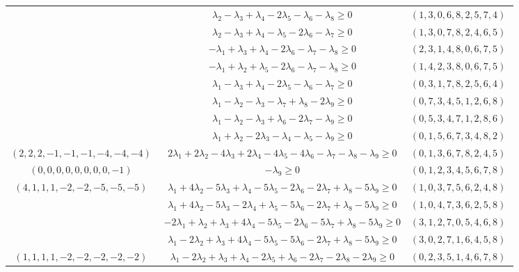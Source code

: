 \documentclass[12pt,landscape]{article}
\begin{document}
\begin{longtable}[l]{|c|c|c|}
 \cline{2-3} 
 & $\lambda_{2}-\lambda_{3} + \lambda_{4}-2\lambda_{5}-\lambda_{6}-\lambda_{8}\geq 0$ & $(1 ,3 ,0 ,6 ,8 ,2 ,5 ,7 ,4) \;$\\ 
 \cline{2-3} 
 & $\lambda_{2}-\lambda_{3} + \lambda_{4}-\lambda_{5}-2\lambda_{6}-\lambda_{7}\geq 0$ & $(1 ,3 ,0 ,7 ,8 ,2 ,4 ,6 ,5) \;$\\ 
 \cline{2-3} 
 & $-\lambda_{1} + \lambda_{3} + \lambda_{4}-2\lambda_{6}-\lambda_{7}-\lambda_{8}\geq 0$ & $(2 ,3 ,1 ,4 ,8 ,0 ,6 ,7 ,5) \;$\\ 
 \cline{2-3} 
 & $-\lambda_{1} + \lambda_{2} + \lambda_{5}-2\lambda_{6}-\lambda_{7}-\lambda_{8}\geq 0$ & $(1 ,4 ,2 ,3 ,8 ,0 ,6 ,7 ,5) \;$\\ 
 \cline{2-3} 
 & $\lambda_{1}-\lambda_{3} + \lambda_{4}-2\lambda_{5}-\lambda_{6}-\lambda_{7}\geq 0$ & $(0 ,3 ,1 ,7 ,8 ,2 ,5 ,6 ,4) \;$\\ 
 \cline{2-3} 
 & $\lambda_{1}-\lambda_{2}-\lambda_{3}-\lambda_{7} + \lambda_{8}-2\lambda_{9}\geq 0$ & $(0 ,7 ,3 ,4 ,5 ,1 ,2 ,6 ,8) \;$\\ 
 \cline{2-3} 
 & $\lambda_{1}-\lambda_{2}-\lambda_{3} + \lambda_{6}-2\lambda_{7}-\lambda_{9}\geq 0$ & $(0 ,5 ,3 ,4 ,7 ,1 ,2 ,8 ,6) \;$\\ 
 \cline{2-3} 
 & $\lambda_{1} + \lambda_{2}-2\lambda_{3}-\lambda_{4}-\lambda_{5}-\lambda_{9}\geq 0$ & $(0 ,1 ,5 ,6 ,7 ,3 ,4 ,8 ,2) \;$\\ \hline\multirow{1}{*}{ $(2 ,2 ,2 ,-1 ,-1 ,-1 ,-4 ,-4 ,-4) \;$ }  & $2\lambda_{1} + 2\lambda_{2}-4\lambda_{3} + 2\lambda_{4}-4\lambda_{5}-4\lambda_{6}-\lambda_{7}-\lambda_{8}-\lambda_{9}\geq 0$ & $(0 ,1 ,3 ,6 ,7 ,8 ,2 ,4 ,5) \;$\\ \hline\multirow{1}{*}{ $(0 ,0 ,0 ,0 ,0 ,0 ,0 ,0 ,-1) \;$ }  & $-\lambda_{9}\geq 0$ & $(0 ,1 ,2 ,3 ,4 ,5 ,6 ,7 ,8) \;$\\ \hline\multirow{4}{*}{ $(4 ,1 ,1 ,1 ,-2 ,-2 ,-5 ,-5 ,-5) \;$ }  & $\lambda_{1} + 4\lambda_{2}-5\lambda_{3} + \lambda_{4}-5\lambda_{5}-2\lambda_{6}-2\lambda_{7} + \lambda_{8}-5\lambda_{9}\geq 0$ & $(1 ,0 ,3 ,7 ,5 ,6 ,2 ,4 ,8) \;$\\ 
 \cline{2-3} 
 & $\lambda_{1} + 4\lambda_{2}-5\lambda_{3}-2\lambda_{4} + \lambda_{5}-5\lambda_{6}-2\lambda_{7} + \lambda_{8}-5\lambda_{9}\geq 0$ & $(1 ,0 ,4 ,7 ,3 ,6 ,2 ,5 ,8) \;$\\ 
 \cline{2-3} 
 & $-2\lambda_{1} + \lambda_{2} + \lambda_{3} + 4\lambda_{4}-5\lambda_{5}-2\lambda_{6}-5\lambda_{7} + \lambda_{8}-5\lambda_{9}\geq 0$ & $(3 ,1 ,2 ,7 ,0 ,5 ,4 ,6 ,8) \;$\\ 
 \cline{2-3} 
 & $\lambda_{1}-2\lambda_{2} + \lambda_{3} + 4\lambda_{4}-5\lambda_{5}-5\lambda_{6}-2\lambda_{7} + \lambda_{8}-5\lambda_{9}\geq 0$ & $(3 ,0 ,2 ,7 ,1 ,6 ,4 ,5 ,8) \;$\\ \hline\multirow{4}{*}{ $(1 ,1 ,1 ,1 ,-2 ,-2 ,-2 ,-2 ,-2) \;$ }  & $\lambda_{1}-2\lambda_{2} + \lambda_{3} + \lambda_{4}-2\lambda_{5} + \lambda_{6}-2\lambda_{7}-2\lambda_{8}-2\lambda_{9}\geq 0$ & $(0 ,2 ,3 ,5 ,1 ,4 ,6 ,7 ,8) \;$\\ 

\end{longtable}
\end{document}

